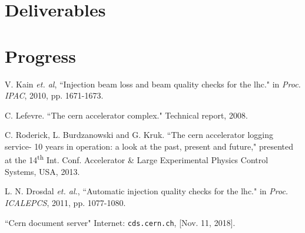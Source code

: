 \documentclass[12pt, twoside]{report}
\begin{document}
	\section{Deliverables}
	
	\section{Progress}
	
	\begin{thebibliography}{5}
		V. Kain \textit{et. al}, ``Injection beam loss and beam quality checks for the lhc." in \textit{Proc. IPAC}, 2010, pp. 1671-1673.
		
		C. Lefevre. ``The cern accelerator complex." Technical report, 2008.
		
		C. Roderick, L. Burdzanowski and G. Kruk. ``The cern accelerator logging service- 10 years in operation: a look at the past, present and future," presented at the 14\textsuperscript{th} Int. Conf. Accelerator \& Large Experimental Physics Control Systems, USA, 2013.
		
		L. N. Drosdal \textit{et. al.}, ``Automatic injection quality checks for the lhc." in \textit{Proc. ICALEPCS}, 2011, pp. 1077-1080.
		
		``Cern document server" Internet: \texttt{cds.cern.ch}, [Nov. 11, 2018].
	\end{thebibliography}
\end{document}
